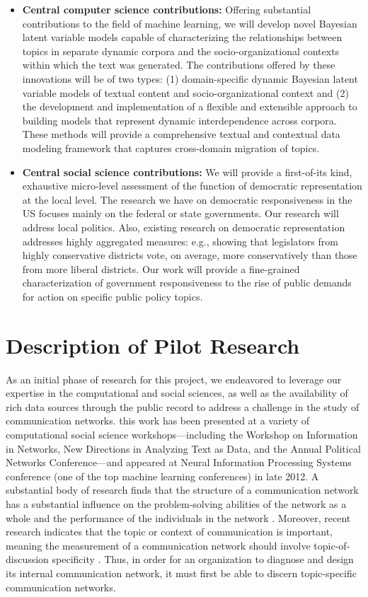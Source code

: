 \begin{itemize}
\item {\bf Central computer science contributions:} Offering substantial contributions to the field of machine learning, we will develop novel Bayesian latent variable models capable of characterizing the relationships between topics in separate dynamic corpora and the socio-organizational contexts within which the text was generated. The contributions offered by these innovations will be of two types: (1) domain-specific dynamic Bayesian latent variable models of textual content and socio-organizational context and (2) the development and implementation of a flexible and extensible approach to building models that represent dynamic interdependence across corpora. These methods will provide a comprehensive textual and contextual data modeling framework that captures cross-domain migration of topics.
\item {\bf Central social science contributions:} We will provide a first-of-its kind, exhaustive micro-level assessment of the function of  democratic representation at the local level. The research we have on democratic responsiveness in the US focuses mainly on the federal or state governments. Our research will address local politics. Also, existing research on democratic representation addresses highly aggregated measures: e.g., showing that legislators from highly conservative districts vote, on average, more conservatively than those from more liberal districts. Our work will provide a fine-grained characterization of government responsiveness to the rise of public demands for action on specific public policy topics.
\end{itemize}



\section{Description of Pilot Research}

As an initial phase of research for this project, we endeavored to leverage our expertise in the computational and social sciences, as well as the availability of rich data sources through the public record to address a challenge in the study of communication networks. this work has been presented at
a variety of computational social science workshops---including the Workshop on Information in Networks, New Directions in Analyzing Text as Data, and the Annual Political Networks Conference---and appeared at Neural Information Processing Systems conference (one of the top machine learning conferences) in late 2012. A substantial body of research finds that the structure of a communication network has a substantial influence on the problem-solving abilities of the network as a whole and the performance of the individuals in the network \cite{Mason2012}. Moreover, recent research indicates that the topic or context of communication is important, meaning the measurement of a communication network should involve topic-of-discussion specificity \cite{Mason2008}. Thus, in order for an organization to diagnose and design its internal communication network, it must first be able to discern topic-specific communication networks.


